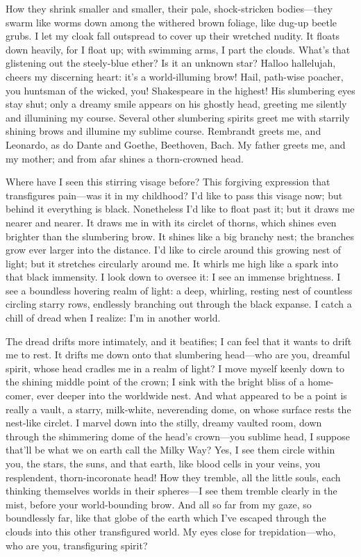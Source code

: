 \documentclass[12pt,a4paper]{article}
\begin{document}
How they shrink smaller and smaller, their pale, shock-stricken bodies—they swarm like worms down among the withered brown foliage, like dug-up beetle grubs. I let my cloak fall outspread to cover up their wretched nudity. It floats down heavily, for I float up; with swimming arms, I part the clouds. What’s that glistening out the steely-blue ether? Is it an unknown star? Halloo hallelujah, cheers my discerning heart: it’s a world-illuming brow! Hail, path-wise poacher, you huntsman of the wicked, you! Shakespeare in the highest! His slumbering eyes stay shut; only a dreamy smile appears on his ghostly head, greeting me silently and illumining my course. Several other slumbering spirits greet me with starrily shining brows and illumine my sublime course. Rembrandt greets me, and Leonardo, as do Dante and Goethe, Beethoven, Bach. My father greets me, and my mother; and from afar shines a thorn-crowned head.

Where have I seen this stirring visage before? This forgiving expression that transfigures pain—was it in my childhood? I’d like to pass this visage now; but behind it everything is black. Nonetheless I’d like to float past it; but it draws me nearer and nearer. It draws me in with its circlet of thorns, which shines even brighter than the slumbering brow. It shines like a big branchy nest; the branches grow ever larger into the distance. I’d like to circle around this growing nest of light; but it stretches circularly around me. It whirls me high like a spark into that black immensity. I look down to oversee it: I see an immense brightness. I see a boundless hovering realm of light: a deep, whirling, resting nest of countless circling starry rows, endlessly branching out through the black expanse. I catch a chill of dread when I realize: I’m in another world.

The dread drifts more intimately, and it beatifies; I can feel that it wants to drift me to rest. It drifts me down onto that slumbering head—who are you, dreamful spirit, whose head cradles me in a realm of light? I move myself keenly down to the shining middle point of the crown; I sink with the bright bliss of a home-comer, ever deeper into the worldwide nest. And what appeared to be a point is really a vault, a starry, milk-white, neverending dome, on whose surface rests the nest-like circlet. I marvel down into the stilly, dreamy vaulted room, down through the shimmering dome of the head’s crown—you sublime head, I suppose that’ll be what we on earth call the Milky Way? Yes, I see them circle within you, the stars, the suns, and that earth, like blood cells in your veins, you resplendent, thorn-incoronate head! How they tremble, all the little souls, each thinking themselves worlds in their spheres—I see them tremble clearly in the mist, before your world-bounding brow. And all so far from my gaze, so boundlessly far, like that globe of the earth which I’ve escaped through the clouds into this other transfigured world. My eyes close for trepidation—who, who are you, transfiguring spirit?
\end{document}
